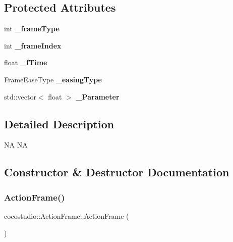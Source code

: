 \subsection*{Protected Attributes}
\begin{DoxyCompactItemize}
\item 
\mbox{\label{classcocostudio_1_1ActionFrame_aa218ee2b103cf447ede7982f31145b0d}} 
int {\bfseries \+\_\+frame\+Type}
\item 
\mbox{\label{classcocostudio_1_1ActionFrame_a2cd1f0478b31da16b13d3573305d9880}} 
int {\bfseries \+\_\+frame\+Index}
\item 
\mbox{\label{classcocostudio_1_1ActionFrame_a1cf6282b3ba236431ebc55490044192f}} 
float {\bfseries \+\_\+f\+Time}
\item 
\mbox{\label{classcocostudio_1_1ActionFrame_ae873ce5f7b6ba4f18ba8badcc96973b2}} 
Frame\+Ease\+Type {\bfseries \+\_\+easing\+Type}
\item 
\mbox{\label{classcocostudio_1_1ActionFrame_a5a9dca489ea302cc4f4dfebc03e00e9a}} 
std\+::vector$<$ float $>$ {\bfseries \+\_\+\+Parameter}
\end{DoxyCompactItemize}


\subsection{Detailed Description}
NA  NA 

\subsection{Constructor \& Destructor Documentation}
\mbox{\label{classcocostudio_1_1ActionFrame_a830bed4204d29fc48d9564629c28e8e6}} 
\subsubsection{\texorpdfstring{Action\+Frame()}{ActionFrame()}\hspace{0.1cm}{\footnotesize\ttfamily [1/2]}}
{\footnotesize\ttfamily cocostudio\+::\+Action\+Frame\+::\+Action\+Frame (\begin{DoxyParamCaption}{ }\end{DoxyParamCaption})}

